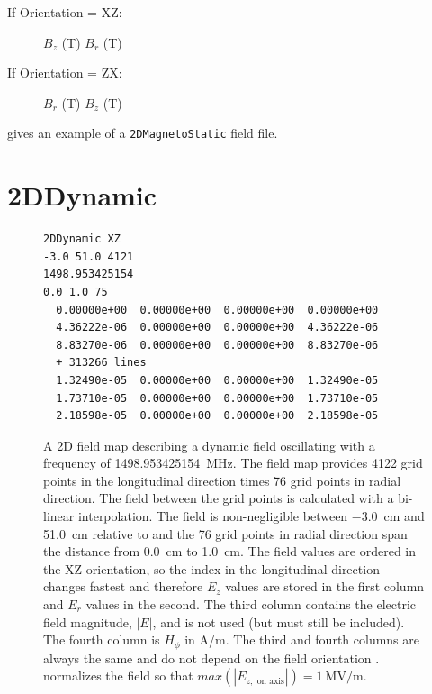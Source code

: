 \begin{description}
\item[If Orientation = XZ:] $B_{z}$ (T) $B_{r}$ (T)
\item[If Orientation = ZX:] $B_{r}$ (T)  $B_{z}$ (T)
\end{description}

 gives an example of a \texttt{2DMagnetoStatic} field file.

\clearpage

\section{2DDynamic}
\label{sec:2DDynamic}
\begin{figure}[h]
  \begin{fmpage}
\begin{verbatim}
2DDynamic XZ
-3.0 51.0 4121
1498.953425154
0.0 1.0 75
  0.00000e+00  0.00000e+00  0.00000e+00  0.00000e+00
  4.36222e-06  0.00000e+00  0.00000e+00  4.36222e-06
  8.83270e-06  0.00000e+00  0.00000e+00  8.83270e-06
  + 313266 lines
  1.32490e-05  0.00000e+00  0.00000e+00  1.32490e-05
  1.73710e-05  0.00000e+00  0.00000e+00  1.73710e-05
  2.18598e-05  0.00000e+00  0.00000e+00  2.18598e-05
\end{verbatim}
  \end{fmpage}
  \caption[Example of a 2DDynamic field map]{A 2D field map describing a dynamic field oscillating with a frequency of
    \SI{1498.953425154}{\mega\hertz}. The field map provides 4122 grid points in the longitudinal direction times 76 grid points in
    radial direction. The field between the grid points is calculated with a bi-linear interpolation. The field is
    non-negligible between \SI{-3.0}{\centi\meter} and \SI{51.0}{\centi\meter} relative to  and the 76 grid points in radial direction
    span the distance from \SI{0.0}{\centi\meter} to \SI{1.0}{\centi\meter}. The field values are ordered in the XZ orientation, so the index in the
    longitudinal direction changes fastest and therefore $E_z$ values are stored in the first column and $E_r$ values
    in the second. The third column contains the electric field magnitude, $|E|$, and is not used (but must still be included).
    The fourth column is $H_{\phi}$ in A/m. The third and fourth columns are always the same and do not depend on the field
    orientation . \opalt normalizes the field so that $max(|E_{z,\text{ on axis}}|) = \SI{1}{\mega\volt\per\meter}$.}
  \label{fig:2DDynamic}
\end{figure}

